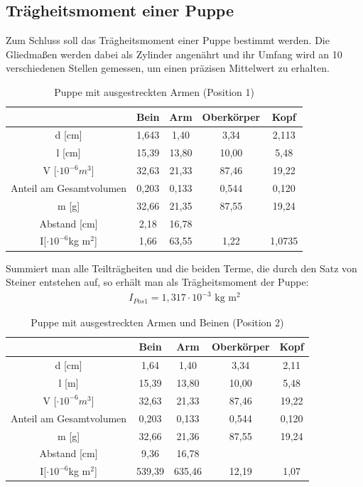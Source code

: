\subsection{Trägheitsmoment einer Puppe}
Zum Schluss soll das Trägheitsmoment einer Puppe bestimmt werden. Die Gliedmaßen werden dabei als Zylinder angenährt und ihr Umfang wird an 10 verschiedenen Stellen gemessen, um einen präzisen Mittelwert zu erhalten.
\begin{table}[htbp]
\begin{tabular}{|c|c|c|c|c|}
\hline 		
&	Bein&	Arm	&Oberkörper	&Kopf	\\ \hline	
d [cm]&	1,643&	1,40&	3,34&	2,113\\ \hline				
l [cm] &	15,39	&13,80	&10,00	&5,48\\ \hline	
					
V [$\cdot 10^{-6} m^3$]	&32,63	&21,33	&87,46	&19,22	\\ \hline	
Anteil am Gesamtvolumen	&0,203	&0,133	&0,544	&0,120	\\ \hline		
m [g]	&32,66	&21,35	&87,55 &19,24\\ \hline
Abstand [cm]	&2,18	&16,78	&&\\ \hline	
					
I[$\cdot 10^{-6}$kg m$^2$]&		 1,66	&63,55&	1,22	&1,0735\\ \hline	
\end{tabular} 
\caption{Puppe mit ausgestreckten Armen (Position 1)}
\end{table}

Summiert man alle Teilträgheiten und die beiden Terme, die durch den Satz von Steiner entstehen auf, so erhält man als Trägheitsmoment der Puppe:
\begin{align*}
I_{Pos 1}= 1,317\cdot 10^{-3}\text{ kg m$^2$}
\end{align*}

\begin{table}[htbp]
\begin{tabular}{|c|c|c|c|c|}
\hline 		
&	Bein&	Arm	&Oberkörper	&Kopf	\\ \hline	
d [cm]	&1,64&	1,40	&3,34	&2,11	\\ \hline		
l [m]	&15,39	&13,80	&10,00	&5,48\\ \hline	
V [$\cdot10^{-6}m^3$]	&32,63	&21,33	&87,46	&19,22\\ \hline	
Anteil am Gesamtvolumen&	0,203	&0,133&	0,544	&0,120\\ \hline
m [g]	&32,66&	21,36	&87,55	&19,24\\ \hline	
Abstand [cm]&	9,36	&16,78&&\\ \hline	
I[$\cdot 10^{-6}$kg m$^2$]&		539,39&	635,46&	12,19&	1,07\\ \hline	
\end{tabular} 
\caption{Puppe mit ausgestreckten Armen und Beinen (Position 2)}
\end{table}

